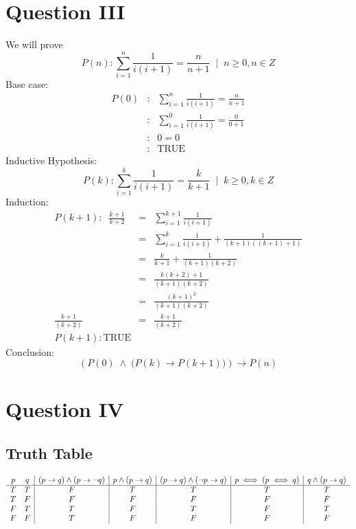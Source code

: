 \documentclass{article}
\begin{document}
\section*{Question III}
We will prove
$$
P(n) \colon \sum^n_{i=1} \frac{1}{i(i+1)} = \frac{n}{n+1} \;\; \biggr | \;\; n \geq 0, n \in Z
$$
Base case:
\begin{eqnarray*}
P(0) &\colon& \sum^n_{i=1} \frac{1}{i(i+1)} = \frac{n}{n+1} \\
&\colon& \sum^0_{i=1} \frac{1}{i(i+1)} = \frac{0}{0+1} \\
&\colon& 0 = 0 \\
&\colon& \textrm{TRUE}
\end{eqnarray*}
Inductive Hypothesis:
$$
P(k) \colon \sum^k_{i=1} \frac{1}{i(i+1)} = \frac{k}{k+1} \;\; \biggr | \;\; k \geq 0, k \in Z
$$
Induction:
\begin{eqnarray*}
P(k+1) \colon \;\; \frac{k+1}{k+2} &=& \sum^{k+1}_{i=1} \frac{1}{i(i+1)}  \\
&=& \sum^k_{i=1} \frac{1}{i(i+1)} + \frac{1}{(k+1)((k+1)+1)} \\
&=& \frac{k}{k+1} + \frac{1}{(k+1)(k+2)} \\ 
&=& \frac{k(k+2) + 1}{(k+1)(k+2)} \\ 
&=& \frac{(k+1)^2}{(k+1)(k+2)} \\
\frac{k+1}{(k+2)} &=& \frac{k+1}{(k+2)} \\
P(k+1) \colon \textrm{TRUE}
\end{eqnarray*}
Conclusion:
$$
\left (  P(0) \; \land \; \biggr ( P(k) \rightarrow P(k+1) \biggr ) \right ) \rightarrow P(n) 
$$

\section*{Question IV}

\subsection*{Truth Table}
\begin{displaymath}
\begin{array}{c c|c|c|c|c|c} %
p & q & 
(p \rightarrow q) \land (p \rightarrow \neg q) & 
p \land (p \rightarrow q) & 
(p \rightarrow q) \land (\neg p \rightarrow q) &
p \iff (p \iff q) &
q \land (p \rightarrow q)
\\ 
\hline
T & T & F & T & T & T & T \\
T & F & F & F & F & F & F \\
F & T & T & F & T & F & T \\
F & F & T & F & F & F & F 
\end{array}
\end{displaymath}
\end{document}
